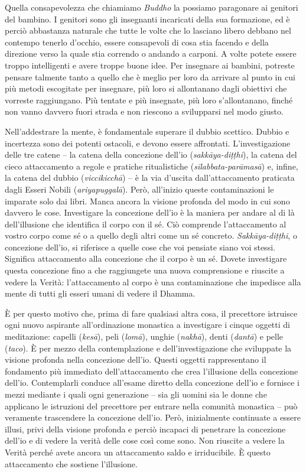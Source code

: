 Quella consapevolezza che chiamiamo \emph{Buddho} la possiamo paragonare
ai genitori del bambino. I genitori sono gli insegnanti incaricati della
sua formazione, ed è perciò abbastanza naturale che tutte le volte che
lo lasciano libero debbano nel contempo tenerlo d'occhio, essere
consapevoli di cosa stia facendo e della direzione verso la quale stia
correndo o andando a carponi. A volte potete essere troppo intelligenti
e avere troppe buone idee. Per insegnare ai bambini, potreste pensare
talmente tanto a quello che è meglio per loro da arrivare al punto in
cui più metodi escogitate per insegnare, più loro si allontanano dagli
obiettivi che vorreste raggiungano. Più tentate e più insegnate, più
loro s'allontanano, finché non vanno davvero fuori strada e non riescono
a svilupparsi nel modo giusto.

Nell'addestrare la mente, è fondamentale superare il dubbio scettico.
Dubbio e incertezza sono dei potenti ostacoli, e devono essere
affrontati. L'investigazione delle tre catene -- la catena della
concezione dell'io (\emph{sakkāya-diṭṭhi}), la catena del cieco
attaccamento a regole e pratiche ritualistiche
(\emph{sīlabbata-parāmasā}) e, infine, la catena del dubbio
(\emph{viccikicchā}) -- è la via d'uscita dall'attaccamento praticata
dagli Esseri Nobili (\emph{ariyapuggalā}). Però, all'inizio queste
contaminazioni le imparate solo dai libri. Manca ancora la visione
profonda del modo in cui sono davvero le cose. Investigare la concezione
dell'io è la maniera per andare al di là dell'illusione che identifica
il corpo con il sé. Ciò comprende l'attaccamento al vostro corpo come sé
o a quello degli altri come un sé concreto. \emph{Sakkāya-diṭṭhi}, o
concezione dell'io, si riferisce a quelle cose che voi pensiate siano
voi stessi. Significa attaccamento alla concezione che il corpo è un sé.
Dovete investigare questa concezione fino a che raggiungete una nuova
comprensione e riuscite a vedere la Verità: l'attaccamento al corpo è
una contaminazione che impedisce alla mente di tutti gli esseri umani di
vedere il Dhamma.

È per questo motivo che, prima di fare qualsiasi altra cosa, il
precettore istruisce ogni nuovo aspirante all'ordinazione monastica a
investigare i cinque oggetti di meditazione: capelli (\emph{kesā}), peli
(\emph{lomā}), unghie (\emph{nakhā}), denti (\emph{dantā}) e pelle
(\emph{taco}). È per mezzo della contemplazione e dell'investigazione
che sviluppate la visione profonda nella concezione dell'io. Questi
oggetti rappresentano il fondamento più immediato dell'attaccamento che
crea l'illusione della concezione dell'io. Contemplarli conduce
all'esame diretto della concezione dell'io e fornisce i mezzi mediante i
quali ogni generazione -- sia gli uomini sia le donne che applicano le
istruzioni del precettore per entrare nella comunità monastica -- può
veramente trascendere la concezione dell'io. Però, inizialmente
continuate a essere illusi, privi della visione profonda e perciò
incapaci di penetrare la concezione dell'io e di vedere la verità delle
cose così come sono. Non riuscite a vedere la Verità perché avete ancora
un attaccamento saldo e irriducibile. È questo attaccamento che sostiene
l'illusione.


